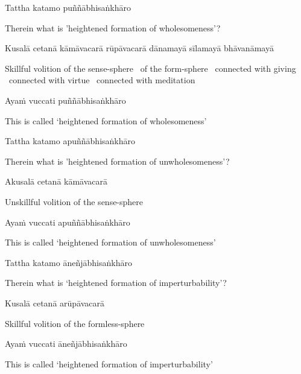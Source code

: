 Tattha katamo puññābhisaṅkhāro

\begin{english}
  Therein what is 'heightened formation of wholesomeness'?
\end{english}

\begin{pali-hang}
  Kusalā cetanā kāmāvacarā rūpāvacarā dānamayā sīlamayā bhāvanāmayā
\end{pali-hang}

\begin{english-hang}
  Skillful volition of the sense-sphere \breathmark\ of the form-sphere \breathmark\ connected with giving \breathmark\ connected with virtue \breathmark\ connected with meditation
\end{english-hang}

Ayaṁ vuccati puññābhisaṅkhāro

\begin{english}
  This is called `heightened formation of wholesomeness'
\end{english}

Tattha katamo apuññābhisaṅkhāro

\begin{english}
  Therein what is 'heightened formation of unwholesomeness'?
\end{english}

Akusalā cetanā kāmāvacarā

\begin{english}
  Unskillful volition of the sense-sphere
\end{english}

Ayaṁ vuccati apuññābhisaṅkhāro

\begin{english}
  This is called `heightened formation of unwholesomeness'
\end{english}

Tattha katamo āneñjābhisaṅkhāro

\begin{english}
  Therein what is `heightened formation of imperturbability'?
\end{english}

Kusalā cetanā arūpāvacarā

\begin{english}
  Skillful volition of the formless-sphere
\end{english}

Ayaṁ vuccati āneñjābhisaṅkhāro

\begin{english}
  This is called `heightened formation of imperturbability'
\end{english}

